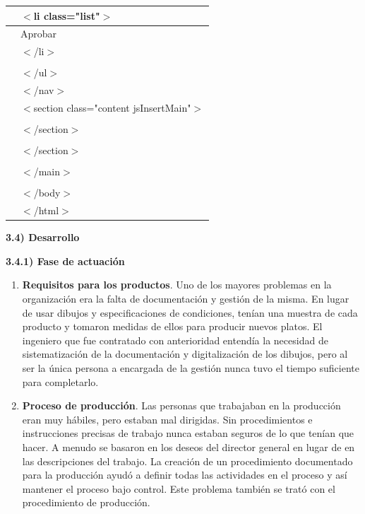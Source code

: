 \documentclass{article} %
\begin{document}
\begin{tabular}{|p{0.6in}|p{4.0in}|}
 &      $\mathrm{<}$li class="list"$\mathrm{>}$ \\ \hline 
 &       Aprobar \\ \hline 
 &      $\mathrm{<}$/li$\mathrm{>}$ \\ \hline 
 &       \\ \hline 
 &     $\mathrm{<}$/ul$\mathrm{>}$ \\ \hline 
 &    $\mathrm{<}$/nav$\mathrm{>}$ \\ \hline 
 &    $\mathrm{<}$section class="content jsInsertMain"$\mathrm{>}$ \\ \hline 
 &      \\ \hline 
 &    $\mathrm{<}$/section$\mathrm{>}$ \\ \hline 
 & \newline  \\ \hline 
 &   $\mathrm{<}$/section$\mathrm{>}$ \\ \hline 
 &    \\ \hline 
 &  $\mathrm{<}$/main$\mathrm{>}$ \\ \hline 
 &   \\ \hline 
 & $\mathrm{<}$/body$\mathrm{>}$ \\ \hline 
 & $\mathrm{<}$/html$\mathrm{>}$ \\ \hline 
\end{tabular}



\noindent 

\noindent 

\noindent 

\noindent 

\noindent \textbf{3.4) Desarrollo}

\noindent \textbf{       3.4.1) Fase de actuaci\'{o}n}

\begin{enumerate}
\item \textbf{ Requisitos para los productos}. Uno de los mayores problemas en la organizaci\'{o}n era la falta de documentaci\'{o}n y gesti\'{o}n de la misma. En lugar de usar dibujos y especificaciones de condiciones, ten\'{i}an una muestra de cada producto y tomaron medidas de ellos para producir nuevos platos. El ingeniero que fue contratado con anterioridad entend\'{i}a la necesidad de sistematizaci\'{o}n de la documentaci\'{o}n y digitalizaci\'{o}n de los dibujos, pero al ser la \'{u}nica persona a encargada de la gesti\'{o}n nunca tuvo el tiempo suficiente para completarlo.

\item  \textbf{Proceso de producci\'{o}n}. Las personas que trabajaban en la producci\'{o}n eran muy h\'{a}biles, pero estaban mal dirigidas. Sin procedimientos e instrucciones precisas de trabajo nunca estaban seguros de lo que ten\'{i}an que hacer. A menudo se basaron en los deseos del director general en lugar de en las descripciones del trabajo. La creaci\'{o}n de un procedimiento documentado para la producci\'{o}n ayud\'{o} a definir todas las actividades en el proceso y as\'{i} mantener el proceso bajo control. Este problema tambi\'{e}n se trat\'{o} con el procedimiento de producci\'{o}n.
\end{enumerate}
\end{document}
